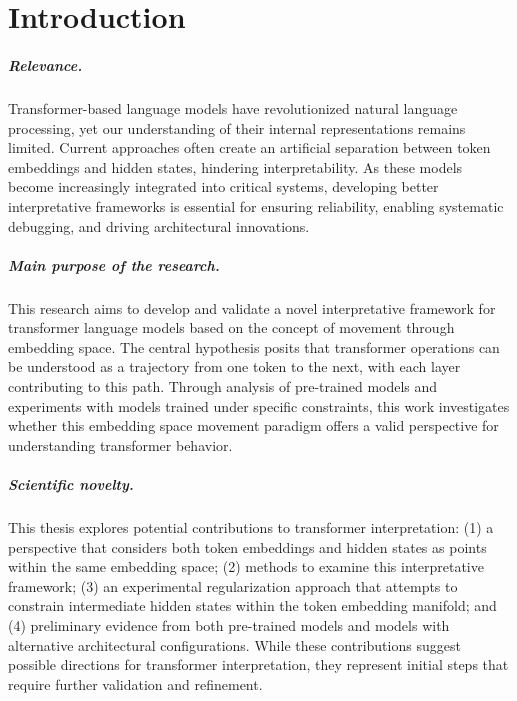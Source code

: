 \chapter{Introduction}

\paragraph{Relevance.}
Transformer-based language models have revolutionized natural language processing, yet our understanding of their internal representations remains limited. Current approaches often create an artificial separation between token embeddings and hidden states, hindering interpretability. As these models become increasingly integrated into critical systems, developing better interpretative frameworks is essential for ensuring reliability, enabling systematic debugging, and driving architectural innovations.

\paragraph{Main purpose of the research.}
This research aims to develop and validate a novel interpretative framework for transformer language models based on the concept of movement through embedding space. The central hypothesis posits that transformer operations can be understood as a trajectory from one token to the next, with each layer contributing to this path. Through analysis of pre-trained models and experiments with models trained under specific constraints, this work investigates whether this embedding space movement paradigm offers a valid perspective for understanding transformer behavior.

\paragraph{Scientific novelty.}
This thesis explores potential contributions to transformer interpretation: (1) a perspective that considers both token embeddings and hidden states as points within the same embedding space; (2) methods to examine this interpretative framework; (3) an experimental regularization approach that attempts to constrain intermediate hidden states within the token embedding manifold; and (4) preliminary evidence from both pre-trained models and models with alternative architectural configurations. While these contributions suggest possible directions for transformer interpretation, they represent initial steps that require further validation and refinement.

